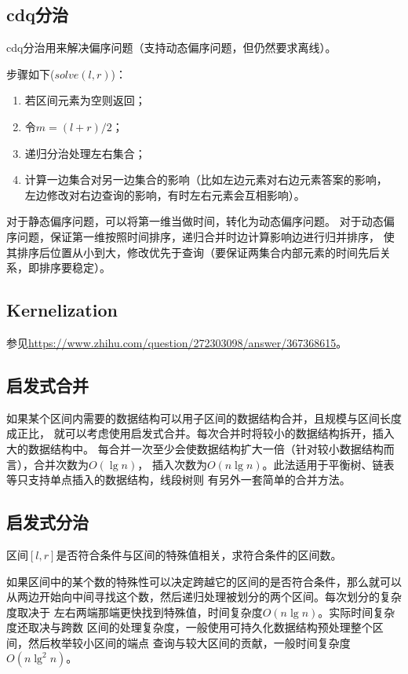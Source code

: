 \subsection{cdq分治}\label{CDQ}
cdq分治用来解决偏序问题（支持动态偏序问题，但仍然要求离线）。

步骤如下($solve(l,r)$)：
\begin{enumerate}
	\item 若区间元素为空则返回；
	\item 令$m=(l+r)/2$；
	\item 递归分治处理左右集合；
	\item 计算一边集合对另一边集合的影响（比如左边元素对右边元素答案的影响，
	      左边修改对右边查询的影响，有时左右元素会互相影响）。
\end{enumerate}

对于静态偏序问题，可以将第一维当做时间，转化为动态偏序问题。
对于动态偏序问题，保证第一维按照时间排序，递归合并时边计算影响边进行归并排序，
使其排序后位置从小到大，修改优先于查询（要保证两集合内部元素的时间先后关系，即排序要稳定）。
\subsection{Kernelization}
参见\url{https://www.zhihu.com/question/272303098/answer/367368615}。
\subsection{启发式合并}
如果某个区间内需要的数据结构可以用子区间的数据结构合并，且规模与区间长度成正比，
就可以考虑使用启发式合并。每次合并时将较小的数据结构拆开，插入大的数据结构中。
每合并一次至少会使数据结构扩大一倍（针对较小数据结构而言），合并次数为$O(\lg n)$，
插入次数为$O(n\lg n)$。此法适用于平衡树、链表等只支持单点插入的数据结构，线段树则
有另外一套简单的合并方法。
\subsection{启发式分治}
区间$[l,r]$是否符合条件与区间的特殊值相关，求符合条件的区间数。

如果区间中的某个数的特殊性可以决定跨越它的区间的是否符合条件，那么就可以
从两边开始向中间寻找这个数，然后递归处理被划分的两个区间。每次划分的复杂度取决于
左右两端那端更快找到特殊值，时间复杂度$O(n\lg n)$。实际时间复杂度还取决与跨数
区间的处理复杂度，一般使用可持久化数据结构预处理整个区间，然后枚举较小区间的端点
查询与较大区间的贡献，一般时间复杂度$O(n\lg^2 n)$。

